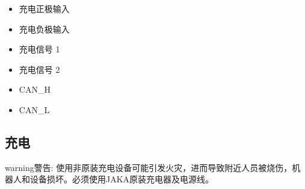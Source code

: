\documentclass[a4paper,11pt,english,openany,oneside]{sphinxmanual}
\begin{document}
\begin{itemize}
\item {} 
 充电正极输入

\item {} 
 充电负极输入

\item {} 
 充电信号 1

\item {} 
 充电信号 2

\item {} 
 CAN\_H

\item {} 
 CAN\_L

\end{itemize}


\subsection{充电}
\label{\detokenize{08 _u5b89_u88c5_u4e0e_u8c03_u8bd5:id25}}\label{\detokenize{08 _u5b89_u88c5_u4e0e_u8c03_u8bd5:id26}}
\begin{sphinxadmonition}{warning}{警告:}
\sphinxAtStartPar
使用非原装充电设备可能引发火灾，进而导致附近人员被烧伤，机器人和设备损坏。必须使用JAKA原装充电器及电源线。
\end{sphinxadmonition}
\end{document}
